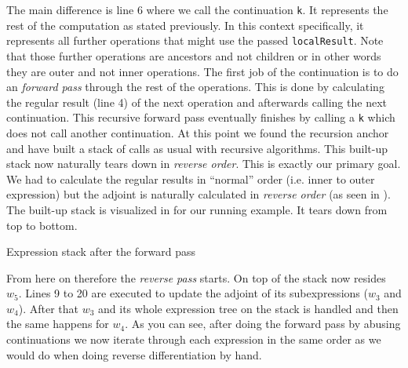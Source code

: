 The main difference is line 6 where we call the continuation \lstinline{k}. It represents the rest of the computation as stated previously. In this context specifically, it represents all further operations that might use the passed \lstinline{localResult}. Note that those further operations are ancestors and not children or in other words they are outer and not inner operations. The first job of the continuation is to do an \emph{forward pass} through the rest of the operations. This is done by calculating the regular result (line 4) of the next operation and afterwards calling the next continuation. This recursive forward pass eventually finishes by calling a \lstinline{k} which does not call another continuation. At this point we found the recursion anchor and have built a stack of calls as usual with recursive algorithms. This built-up stack now naturally tears down in \emph{reverse order}. This is exactly our primary goal. We had to calculate the regular results in ``normal'' order (i.e. inner to outer expression) but the adjoint is naturally calculated in \emph{reverse order} (as seen in ). The built-up stack is visualized in  for our running example. It tears down from top to bottom.
\begin{center}


    \captionsetup{type=figure}
    \caption{Expression stack after the forward pass}
    \label{fig:stack}
\end{center}
From here on therefore the \emph{reverse pass} starts. On top of the stack now resides $w_5$. Lines 9 to 20 are executed to update the adjoint of its subexpressions ($w_3$ and $w_4$). After that $w_3$ and its whole expression tree on the stack is handled and then the same happens for $w_4$. As you can see, after doing the forward pass by abusing continuations we now iterate through each expression in the same order as we would do when doing reverse differentiation by hand.

